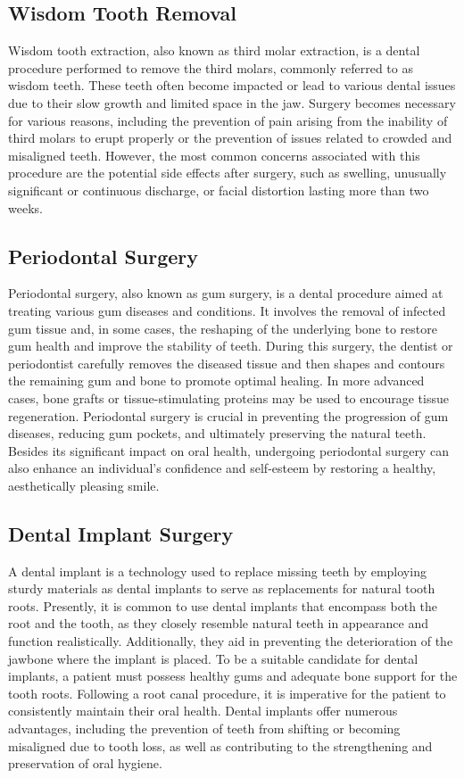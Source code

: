 \documentclass[12pt,oneside,openright,a4paper]{cpe-english-project}
\begin{document}
  \subsection{Wisdom Tooth Removal}
    \qquad Wisdom tooth extraction, also known as third molar extraction, is a dental procedure performed to remove the third molars, commonly referred to as wisdom teeth. These teeth often become impacted or lead to various dental issues due to their slow growth and limited space in the jaw. Surgery becomes necessary for various reasons, including the prevention of pain arising from the inability of third molars to erupt properly or the prevention of issues related to crowded and misaligned teeth. However, the most common concerns associated with this procedure are the potential side effects after surgery, such as swelling, unusually significant or continuous discharge, or facial distortion lasting more than two weeks.\par

  \subsection{Periodontal Surgery}
    \qquad Periodontal surgery, also known as gum surgery, is a dental procedure aimed at treating various gum diseases and conditions. It involves the removal of infected gum tissue and, in some cases, the reshaping of the underlying bone to restore gum health and improve the stability of teeth. During this surgery, the dentist or periodontist carefully removes the diseased tissue and then shapes and contours the remaining gum and bone to promote optimal healing. In more advanced cases, bone grafts or tissue-stimulating proteins may be used to encourage tissue regeneration. Periodontal surgery is crucial in preventing the progression of gum diseases, reducing gum pockets, and ultimately preserving the natural teeth. Besides its significant impact on oral health, undergoing periodontal surgery can also enhance an individual's confidence and self-esteem by restoring a healthy, aesthetically pleasing smile.\par

  \subsection{Dental Implant Surgery}
    \qquad A dental implant is a technology used to replace missing teeth by employing sturdy materials as dental implants to serve as replacements for natural tooth roots. Presently, it is common to use dental implants that encompass both the root and the tooth, as they closely resemble natural teeth in appearance and function realistically. Additionally, they aid in preventing the deterioration of the jawbone where the implant is placed. To be a suitable candidate for dental implants, a patient must possess healthy gums and adequate bone support for the tooth roots. Following a root canal procedure, it is imperative for the patient to consistently maintain their oral health. Dental implants offer numerous advantages, including the prevention of teeth from shifting or becoming misaligned due to tooth loss, as well as contributing to the strengthening and preservation of oral hygiene.\par
\end{document}
